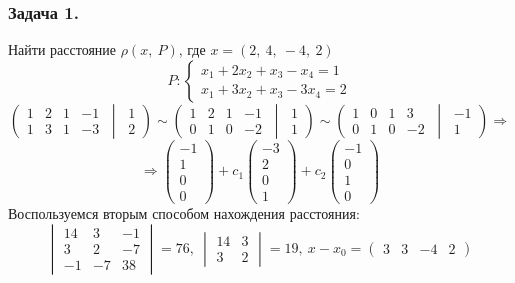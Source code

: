 \documentclass[12pt, letterpaper, twoside]{article}
\begin{document}
\subsubsection*{Задача 1.}
Найти расстояние $\rho(x,\ P)$, где $x = (2,\ 4,\ -4,\ 2)$
\[P:\begin{cases}
    x_1 + 2x_2 + x_3 - x_4 = 1\\
    x_1 + 3x_2 + x_3 - 3x_4 = 2
\end{cases}\]
\[\left(\begin{matrix}
    1 & 2 & 1 & -1\\
    1 & 3 & 1 & -3
\end{matrix}\ \middle|\ \begin{matrix}
    1\\
    2
\end{matrix}\right)\sim \left(\begin{matrix}
    1 & 2 & 1 & -1\\
    0 & 1 & 0 & -2
\end{matrix}\ \middle|\ \begin{matrix}
    1\\
    1
\end{matrix}\right)\sim \left(\begin{matrix}
    1 & 0 & 1 & 3\\
    0 & 1 & 0 & -2
\end{matrix}\ \middle|\ \begin{matrix}
    -1\\
    1
\end{matrix}\right)\Rightarrow\]
\[\Rightarrow \begin{pmatrix}
    -1\\
    1\\
    0\\
    0
\end{pmatrix} + c_1\begin{pmatrix}
    -3\\
    2\\
    0\\
    1
\end{pmatrix} + c_2\begin{pmatrix}
    -1\\
    0\\
    1\\
    0
\end{pmatrix}\]
Воспользуемся вторым способом нахождения расстояния:
\[ \begin{vmatrix}
    14 & 3 & -1\\
    3 & 2 & -7\\
    -1 & -7 & 38
\end{vmatrix} = 76,\ \begin{vmatrix}
    14 & 3\\
    3 & 2
\end{vmatrix} = 19,\ x - x_0  = \begin{pmatrix}
    3 & 3 & -4 & 2
\end{pmatrix}\]
\end{document}
